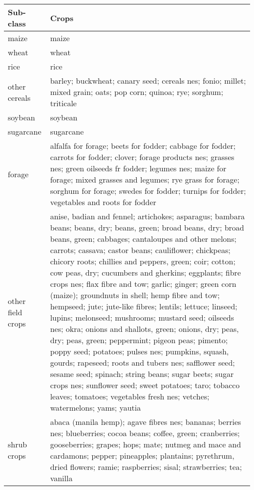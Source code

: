 \begin{table}[ht]
  \begin{center}
    \begin{tabular}{|p{1in}|p{4in}|}
      \hline
      Sub-class & Crops \\
      \hline
      maize & maize \\
      \hline
      wheat & wheat \\
      \hline
      rice & rice \\
      \hline
      other cereals & barley; buckwheat; canary seed; cereals nes; fonio; millet; mixed grain; oats; pop corn; quinoa; rye; sorghum; triticale \\
      \hline
      soybean & soybean \\
      \hline
      sugarcane & sugarcane \\
      \hline
      forage &  alfalfa for forage; beets for fodder; cabbage for fodder; carrots for fodder; clover; forage products nes; grasses nes; green oilseeds fr fodder; legumes nes; maize for forage; mixed grasses and legumes; rye grass for forage; sorghum for forage; swedes for fodder; turnips for fodder; vegetables and roots for fodder \\
      \hline
      other field crops &  anise, badian and fennel; artichokes; asparagus; bambara beans; beans, dry; beans, green; broad beans, dry; broad beans, green; cabbages; cantaloupes and other melons; carrots; cassava; castor beans; cauliflower; chickpeas; chicory roots; chillies and peppers, green; coir; cotton; cow peas, dry; cucumbers and gherkins; eggplants; fibre crops nes; flax fibre and tow; garlic; ginger; green corn (maize); groundnuts in shell; hemp fibre and tow; hempseed; jute; jute-like fibres; lentils; lettuce; linseed; lupins; melonseed; mushrooms; mustard seed; oilseeds nes; okra; onions and shallots, green; onions, dry; peas, dry; peas, green; peppermint; pigeon peas; pimento; poppy seed; potatoes; pulses nes; pumpkins, squash, gourds; rapeseed; roots and tubers nes; safflower seed; sesame seed; spinach; string beans; sugar beets; sugar crops nes; sunflower seed; sweet potatoes; taro; tobacco leaves; tomatoes; vegetables fresh nes; vetches; watermelons; yams; yautia \\
      \hline
      shrub crops &  abaca (manila hemp); agave fibres nes; bananas; berries nes; blueberries; cocoa beans; coffee, green; cranberries; gooseberries; grapes; hops; mate; nutmeg and mace and cardamons; pepper; pineapples; plantains; pyrethrum, dried flowers; ramie; raspberries; sisal; strawberries; tea; vanilla \\

\end{tabular}
\end{center}
\end{table}
